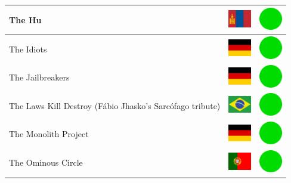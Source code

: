 \documentclass[12pt, a4paper, twoside]{report}
\begin{document}
\begin{center}
\begin{longtable}{|p{5cm}|p{2cm}|p{2cm}|}
The Hu & \includegraphics[width=1cm]{4x3/mn} & \includegraphics[width=1cm]{likes/y} \\ \hline
The Idiots & \includegraphics[width=1cm]{4x3/de} & \includegraphics[width=1cm]{likes/y} \\ \hline
The Jailbreakers & \includegraphics[width=1cm]{4x3/de} & \includegraphics[width=1cm]{likes/y} \\ \hline
The Laws Kill Destroy (Fábio Jhasko's Sarcófago tribute) & \includegraphics[width=1cm]{4x3/br} & \includegraphics[width=1cm]{likes/y} \\ \hline
The Monolith Project & \includegraphics[width=1cm]{4x3/de} & \includegraphics[width=1cm]{likes/y} \\ \hline
The Ominous Circle & \includegraphics[width=1cm]{4x3/pt} & \includegraphics[width=1cm]{likes/y} \\ \hline

\end{longtable}
\end{center}
\end{document}

